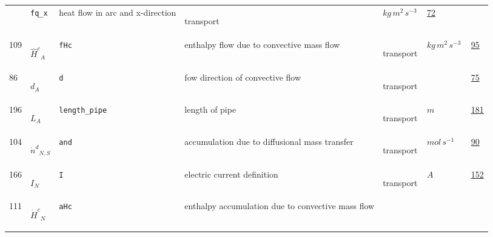 \begin{longtable}{|p{1cm}|p{2.5cm}|p{4.5cm}|p{8cm}|p{3.0cm}|p{3cm}|p{1cm}|}
             & \verb|fq_x|
             & heat flow in arc and x-direction
             & \begin{lay}transport \end{lay}
             & $ kg \,m^{2} \,s^{-3} \, $
             &                 \hyperlink{"e:72"}{ 72 }
                 \\
            109
             & \hypertarget{"v:109"}{ $ {{\hat{H}^c}}{_{A}} $}
             & \verb|fHc|
             & enthalpy flow due to convective mass flow
             & \begin{lay}transport \end{lay}
             & $ kg \,m^{2} \,s^{-3} \, $
             &                 \hyperlink{"e:95"}{ 95 }
                 \\
            86
             & \hypertarget{"v:86"}{ $ {d}{_{A}} $}
             & \verb|d|
             & fow direction of convective flow
             & \begin{lay}transport \end{lay}
             & $  $
             &                 \hyperlink{"e:75"}{ 75 }
                 \\
            196
             & \hypertarget{"v:196"}{ $ {L}{_{A}} $}
             & \verb|length_pipe|
             & length of pipe
             & \begin{lay}transport \end{lay}
             & $ m  $
             &                 \hyperlink{"e:181"}{ 181 }
                 \\
            104
             & \hypertarget{"v:104"}{ $ {{\dot{n}^d}}{_{N, S}} $}
             & \verb|and|
             & accumulation due to diffusional mass transfer
             & \begin{lay}transport \end{lay}
             & $ mol \,s^{-1} \, $
             &                 \hyperlink{"e:90"}{ 90 }
                 \\
            166
             & \hypertarget{"v:166"}{ $ {I}{_{N}} $}
             & \verb|I|
             & electric current definition
             & \begin{lay}transport \end{lay}
             & $ A \, $
             &                 \hyperlink{"e:152"}{ 152 }
                 \\
            111
             & \hypertarget{"v:111"}{ $ {{\dot{H}^c}}{_{N}} $}
             & \verb|aHc|
             & enthalpy accumulation due to convective mass flow

\end{longtable}
